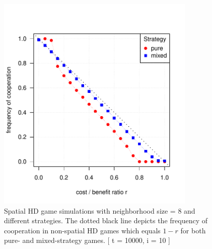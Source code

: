 \begin{figure}[H]
	\centering 
	\includegraphics[width=9.5cm]{task3_multiplot}
	\caption{Spatial HD game simulations with neighborhood size = 8 and different strategies. The dotted black line depicts the frequency of cooperation in non-spatial HD games which equals $1-r$ for both pure- and mixed-strategy games. [ t = 10000, i = 10 ] }\label{fig: task3_multiplot}
\end{figure}






